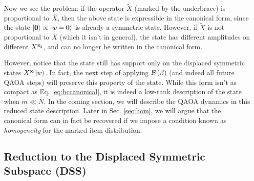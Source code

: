\documentclass[11pt]{article}
\begin{document}
Now we see the problem: if the operator $\tilde{X}$ (marked by the underbrace) is proportional to $\bar{X}$, then the above state is expressible in the canonical form, since the state $|\mathbf{0}\rangle \propto |w=0\rangle$ is already a symmetric state. However, if $\tilde{X}$ is not proportional to $\bar{X}$ (which it isn't in general), the state has different amplitudes on different $X^{\mathbf{x_j}}$, and can no longer be written in the canonical form.

However, notice that the state still has support only on the displaced symmetric states $X^{\mathbf{x_i}}|w\rangle$. In fact, the next step of applying $\mathcal{B}\left(\beta\right)$ (and indeed all future QAOA steps) will preserve this property of the state. While this form isn't as compact as Eq. \ref{eq:bccanonical}, it is indeed a low-rank description of the state when $m\ll N$. In the coming section, we will describe the QAOA dynamics in this reduced state description. Later in Sec. \ref{sec:hom}, we will argue that the canonical form can in fact be recovered if we impose a condition known as \emph{homogeneity} for the marked item distribution. 

\subsection{Reduction to the Displaced Symmetric Subspace (DSS)}
\label{sec:mpolyn}
\end{document}
